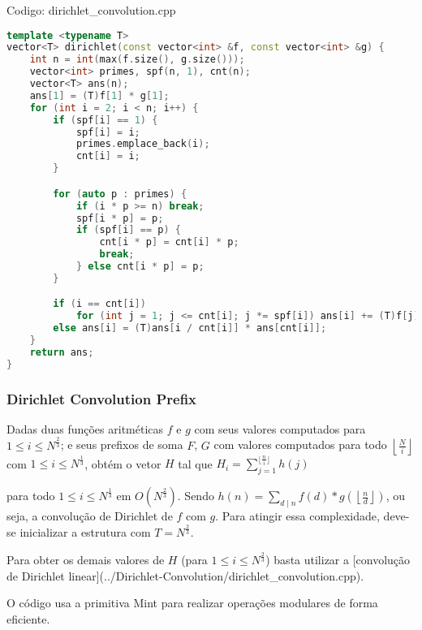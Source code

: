 \documentclass[10pt, a4paper, oneside]{book}
\begin{document}
\hfill

Codigo: dirichlet\_convolution.cpp

\begin{lstlisting}[language=C++]
template <typename T>
vector<T> dirichlet(const vector<int> &f, const vector<int> &g) {
    int n = int(max(f.size(), g.size()));
    vector<int> primes, spf(n, 1), cnt(n);
    vector<T> ans(n);
    ans[1] = (T)f[1] * g[1];
    for (int i = 2; i < n; i++) {
        if (spf[i] == 1) {
            spf[i] = i;
            primes.emplace_back(i);
            cnt[i] = i;
        }

        for (auto p : primes) {
            if (i * p >= n) break;
            spf[i * p] = p;
            if (spf[i] == p) {
                cnt[i * p] = cnt[i] * p;
                break;
            } else cnt[i * p] = p;
        }

        if (i == cnt[i])
            for (int j = 1; j <= cnt[i]; j *= spf[i]) ans[i] += (T)f[j] * g[cnt[i] / j];
        else ans[i] = (T)ans[i / cnt[i]] * ans[cnt[i]];
    }
    return ans;
}
\end{lstlisting}
\hfill

\subsubsection{Dirichlet Convolution Prefix}


Dadas duas funções aritméticas $f$ e $g$ com seus valores computados para $1 \le i \le N ^ {\frac{2}{3}}$; e seus prefixos de soma $F$, $G$ com valores computados para todo $\left\lfloor   \frac{N}{i}  \right\rfloor$  com $1 \leq i \leq N ^ {\frac{1}{3}}$, obtém o vetor $H$ tal que $ H_{i} = \sum_{j=1}^{\bigl\lfloor\frac{n}{i} \bigr\rfloor} h(j) $  



para todo $1 \leq i \leq N ^ {\frac{1}{3}}$ em $O(N ^ {\frac{2}{3}})$.  Sendo  $h(n) = \sum_{d \mid n} f(d) * g\left(\left\lfloor  \frac{n}{d}  \right\rfloor\right)$, ou seja, a convolução de Dirichlet de $f$ com $g$. Para atingir essa complexidade, deve-se inicializar a estrutura com $T = N^{\frac{2}{3}}$.



Para obter os demais valores de $H$ (para $1 \leq i \leq N ^ {\frac{2}{3}}$) basta utilizar a [convolução de Dirichlet linear](../Dirichlet-Convolution/dirichlet\_convolution.cpp).



O código usa a primitiva Mint para realizar operações modulares de forma eficiente.
\end{document}
